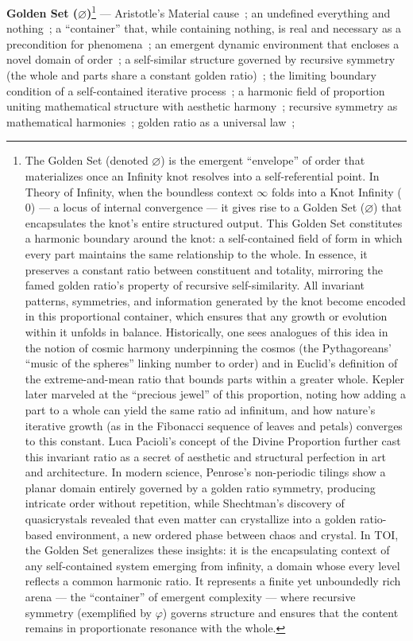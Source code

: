 \documentclass[11pt]{article}
\newcommand{\goldenset}{\varnothing}
\begin{document}
\newpage



\textbf{Golden Set ($\goldenset$)}\label{def:golden_set}\footnote{The Golden Set (denoted $\goldenset$) is the emergent “envelope” of order that materializes once an Infinity knot resolves into a self-referential point. In Theory of Infinity, when the boundless context $\infty$ folds into a Knot Infinity ($0$) --- a locus of internal convergence --- it gives rise to a Golden Set ($\goldenset$) that encapsulates the knot's entire structured output. This Golden Set constitutes a harmonic boundary around the knot: a self-contained field of form in which every part maintains the same relationship to the whole. In essence, it preserves a constant ratio between constituent and totality, mirroring the famed golden ratio's property of recursive self-similarity. All invariant patterns, symmetries, and information generated by the knot become encoded in this proportional container, which ensures that any growth or evolution within it unfolds in balance. Historically, one sees analogues of this idea in the notion of cosmic harmony underpinning the cosmos (the Pythagoreans' “music of the spheres” linking number to order) and in Euclid's definition of the extreme-and-mean ratio that bounds parts within a greater whole. Kepler later marveled at the “precious jewel” of this proportion, noting how adding a part to a whole can yield the same ratio ad infinitum, and how nature's iterative growth (as in the Fibonacci sequence of leaves and petals) converges to this constant. Luca Pacioli's concept of the Divine Proportion further cast this invariant ratio as a secret of aesthetic and structural perfection in art and architecture. In modern science, Penrose's non-periodic tilings show a planar domain entirely governed by a golden ratio symmetry, producing intricate order without repetition, while Shechtman's discovery of quasicrystals revealed that even matter can crystallize into a golden ratio-based environment, a new ordered phase between chaos and crystal. In TOI, the Golden Set generalizes these insights: it is the encapsulating context of any self-contained system emerging from infinity, a domain whose every level reflects a common harmonic ratio. It represents a finite yet unboundedly rich arena --- the “container” of emergent complexity --- where recursive symmetry (exemplified by $\varphi$) governs structure and ensures that the content remains in proportionate resonance with the whole.} ---  Aristotle's Material cause~\cite{AristotleMaterialCause}; an undefined everything and nothing~\cite{AnaximanderApeiron}; a “container” that, while containing nothing, is real and necessary as a precondition for phenomena~\cite{Pascal1647}; an emergent dynamic environment that encloses a novel domain of order~\cite{Pythagoras}; a self-similar structure governed by recursive symmetry (the whole and parts share a constant golden ratio)~\cite{Euclid}; the limiting boundary condition of a self-contained iterative process~\cite{Fibonacci1202}; a harmonic field of proportion uniting mathematical structure with aesthetic harmony~\cite{Pacioli1509}; recursive symmetry as mathematical harmonies~\cite{Kepler1619}; golden ratio as a universal law~\cite{Zeising1854}; 
\end{document}
